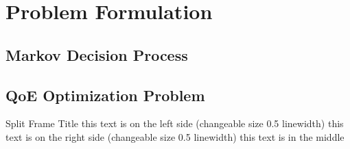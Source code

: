 \section{Problem Formulation}
\subsection{Markov Decision Process}
\subsection{QoE Optimization Problem}


\begin{splitframe}{0.5}{0.5}{Split Frame Title}
{this text is on the left side (changeable size 0.5 linewidth)}
{this text is on the right side (changeable size 0.5 linewidth)}
this text is in the middle
\end{splitframe}